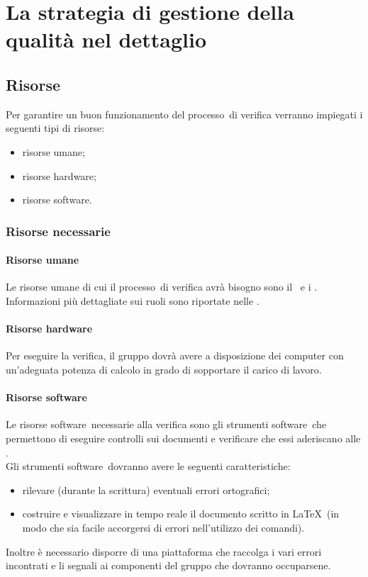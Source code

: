 \documentclass[../PianoDiQualifica.tex]{subfiles}
\begin{document}
\section{La strategia di gestione della qualità nel dettaglio}
		\subsection{Risorse}
		Per garantire un buon funzionamento del processo\g\ di verifica verranno impiegati i seguenti tipi di risorse:
		\begin{itemize}
			\item risorse umane;
			\item risorse hardware;
			\item risorse software\g.
		\end{itemize}
			\subsubsection{Risorse necessarie}
				\paragraph{Risorse umane}
				Le risorse umane di cui il processo\g\ di verifica avrà bisogno sono il \responsabilediprogetto\ e i \verificatori.
				Informazioni più dettagliate sui ruoli sono riportate nelle \normediprogettov.
				\paragraph{Risorse hardware}
				Per eseguire la verifica, il gruppo dovrà avere a disposizione dei computer con un'adeguata potenza di calcolo in grado di sopportare il carico di lavoro.		    
				\paragraph{Risorse software}
			    Le risorse software\g\ necessarie alla verifica sono gli strumenti software\g\ 
che permettono di eseguire controlli sui documenti e verificare che essi aderiscano alle \normediprogettov.\\
			    Gli strumenti software\g\ dovranno avere le seguenti caratteristiche:
			    \begin{itemize}
			    	\item rilevare (durante la scrittura) eventuali errori ortografici;
			    	\item costruire e visualizzare in tempo reale il documento scritto in \LaTeX\g\ (in modo che sia facile accorgersi di errori nell'utilizzo dei comandi).
			    \end{itemize}
			    Inoltre è necessario disporre di una piattaforma che raccolga i vari errori incontrati e li segnali ai componenti del gruppo che dovranno occuparsene. 
\end{document}
